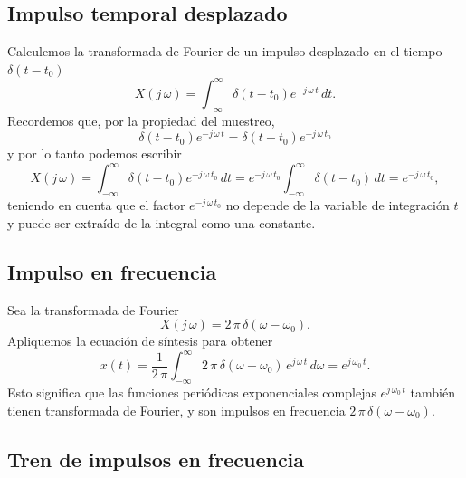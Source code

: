 \documentclass[11pt,a4paper,openany]{book}
\begin{document}
\subsection{Impulso temporal desplazado}

Calculemos la transformada de Fourier de un impulso desplazado en el tiempo $\delta(t - t_{0})$
\begin{equation}
	X(j \, \omega) = \int_{-\infty}^{\infty} \delta(t - t_{0}) e^{-j \, \omega \, t} \, dt.
\end{equation}
Recordemos que, por la propiedad del muestreo,
\begin{equation}
	\delta(t - t_{0}) e^{-j \, \omega \, t} = \delta(t - t_{0}) e^{-j \, \omega \, t_{0}}
\end{equation}
y por lo tanto podemos escribir
\begin{equation}
	X(j \, \omega) = \int_{-\infty}^{\infty} \delta(t - t_{0}) e^{-j \, \omega \, t_{0}} \, dt = e^{-j \, \omega \, t_{0}} \int_{-\infty}^{\infty} \delta(t - t_0) \, dt = e^{-j \, \omega \, t_{0}},
\end{equation}
teniendo en cuenta que el factor $e^{-j \, \omega \, t_{0}}$ no depende de la variable de integración $t$ y puede ser extraído de la integral como una constante.

\subsection{Impulso en frecuencia}

Sea la transformada de Fourier 
\begin{equation}
	X(j \, \omega) = 2 \, \pi \, \delta(\omega - \omega_{0}) .
\end{equation}
Apliquemos la ecuación de síntesis para obtener 
\begin{equation}
	x(t) = \frac{1}{2 \, \pi} \int_{-\infty}^{\infty} 2 \, \pi \, \delta(\omega - \omega_{0}) \, e^{j \, \omega \, t} \, d\omega = e^{j \, \omega_{0} \, t}.
\end{equation}
Esto significa que las funciones periódicas exponenciales complejas $e^{j \, \omega_{0} \, t}$ también tienen transformada de Fourier, y son impulsos en frecuencia $2 \, \pi \, \delta(\omega - \omega_{0})$.

\subsection{Tren de impulsos en frecuencia}
\end{document}
